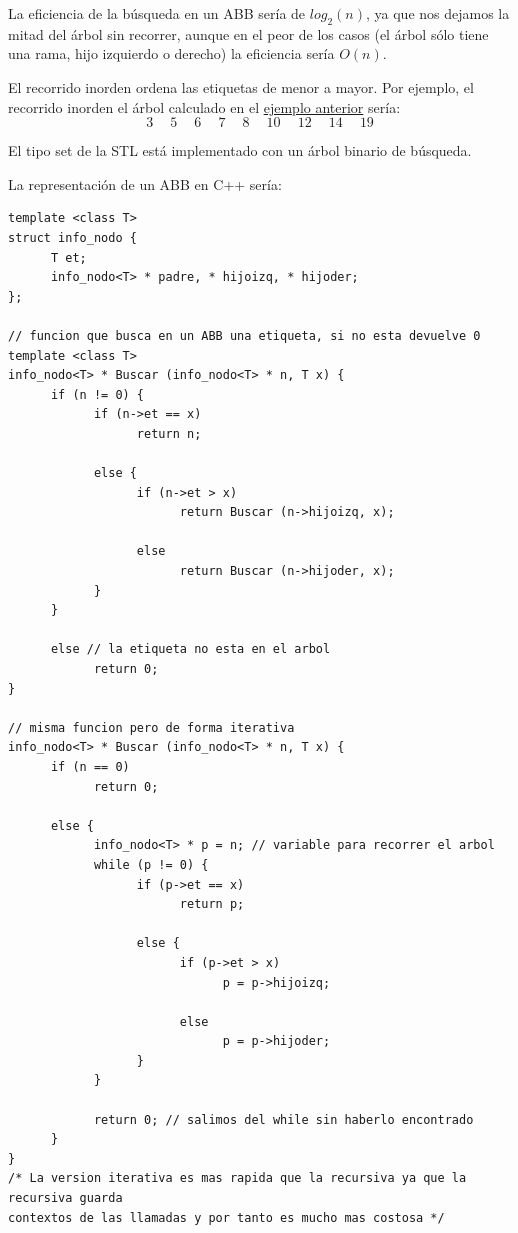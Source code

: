 \documentclass[10pt,a4paper,spanish]{report}
\begin{document}
\noindent
La eficiencia de la búsqueda en un ABB sería de $log_2 (n)$, ya que nos dejamos la mitad del árbol sin recorrer, aunque en el peor de los casos (el árbol sólo tiene una rama, hijo izquierdo o derecho) la eficiencia sería $O(n)$.

\noindent
El recorrido inorden ordena las etiquetas de menor a mayor. Por ejemplo, el recorrido inorden el árbol calculado en el \hyperref[ejemplo_abb]{ejemplo anterior} sería:
\begin{displaymath}
3 \quad\ 5 \quad\ 6 \quad\ 7 \quad\ 8 \quad\ 10 \quad\ 12 \quad\ 14 \quad\ 19
\end{displaymath}

\noindent
El tipo set de la STL está implementado con un árbol binario de búsqueda.

\noindent
La representación de un ABB en C++ sería:

\begin{verbatim}
template <class T>
struct info_nodo {
      T et;
      info_nodo<T> * padre, * hijoizq, * hijoder;
};

// funcion que busca en un ABB una etiqueta, si no esta devuelve 0
template <class T>
info_nodo<T> * Buscar (info_nodo<T> * n, T x) {
      if (n != 0) {
            if (n->et == x)
                  return n;

            else {
                  if (n->et > x)
                        return Buscar (n->hijoizq, x);

                  else
                        return Buscar (n->hijoder, x);
            }
      }

      else // la etiqueta no esta en el arbol
            return 0;
}

// misma funcion pero de forma iterativa
info_nodo<T> * Buscar (info_nodo<T> * n, T x) {
      if (n == 0)
            return 0;

      else {
            info_nodo<T> * p = n; // variable para recorrer el arbol
            while (p != 0) {
                  if (p->et == x)
                        return p;

                  else {
                        if (p->et > x)
                              p = p->hijoizq;

                        else
                              p = p->hijoder;
                  }
            }

            return 0; // salimos del while sin haberlo encontrado
      }
}
/* La version iterativa es mas rapida que la recursiva ya que la recursiva guarda 
contextos de las llamadas y por tanto es mucho mas costosa */
\end{verbatim}
\end{document}

